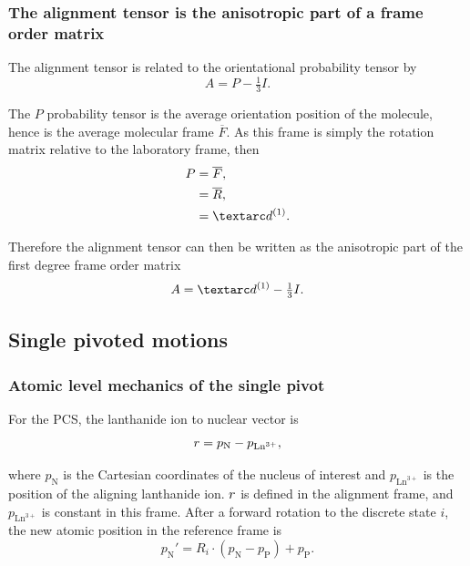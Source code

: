 \subsubsection{The alignment tensor is the anisotropic part of a frame order matrix}

The alignment tensor is related to the orientational probability tensor by
\begin{equation}
    A = P - \tfrac{1}{3} I .
\end{equation}

The $P$ probability tensor is the average orientation position of the molecule, hence is the average molecular frame $\overline{F}$.
As this frame is simply the rotation matrix relative to the laboratory frame, then
\begin{subequations}
\begin{align}
    P &= \overline{F} , \\
      &= \overline{R} , \\
      &= \FOone .
\end{align}
\end{subequations}

Therefore the alignment tensor can then be written as the anisotropic part of the first degree frame order matrix
\begin{equation}
    A = \FOone - \tfrac{1}{3} I .
\end{equation}





\subsection{Single pivoted motions}




\subsubsection{Atomic level mechanics of the single pivot}

For the PCS, the lanthanide ion to nuclear vector is
\begin{equation}
    r = p_\textrm{N} - p_{\textrm{Ln}^{3+}},
\end{equation}

where $p_\textrm{N}$ is the Cartesian coordinates of the nucleus of interest and $p_{\textrm{Ln}^{3+}}$ is the position of the aligning lanthanide ion.
$r$ is defined in the alignment frame, and $p_{\textrm{Ln}^{3+}}$ is constant in this frame.
After a forward rotation to the discrete state $i$, the new atomic position in the reference frame is
\begin{equation}
    p_\textrm{N}' = R_i \cdot \left( p_\textrm{N} - p_\textrm{P} \right) + p_\textrm{P}.
\end{equation}

